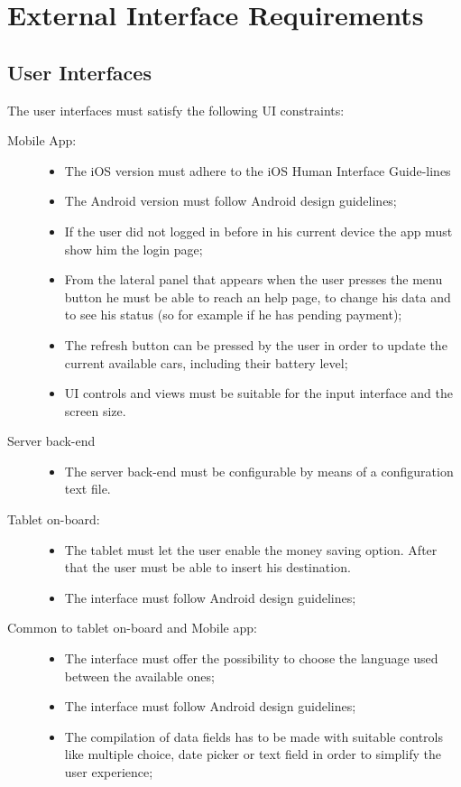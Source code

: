 \section{External Interface Requirements}

\subsection{User Interfaces}
The user interfaces must satisfy the following UI constraints:
\begin{description}
\item[Mobile App:]
	\begin{itemize}
	\item The iOS version must adhere to the iOS Human Interface Guide-lines
	\item The Android version must follow Android design guidelines;
	\item If the user did not logged in before in his current device the app must show him the login page;
	\item From the lateral panel that appears when the user presses the menu button he must be able to reach an help page, to change his data and to see his status (so for example if he has pending payment);
	\item The refresh button can be pressed by the user in order to update the current available cars, including their battery level;
	\item UI controls and views must be suitable for the input interface and the screen size.
	\end{itemize}
\item[Server back-end]
	\begin{itemize}
	\item The server back-end must be configurable by means of a configuration text file.
	\end{itemize}
\item[Tablet on-board:]
	\begin{itemize}
	\item The tablet must let the user enable the money saving option. After that the user must be able to insert his destination.
	\item The interface must follow Android design guidelines;
	\end{itemize}
\item[Common to tablet on-board and Mobile app:]
\begin{itemize}
	\item The interface must offer the possibility to choose the language used between the available ones;
	\item The interface must follow Android design guidelines;
	\item The compilation of data fields has to be made with suitable controls like multiple choice, date picker or text field in order to simplify the user experience;
	\end{itemize}
\end{description}


